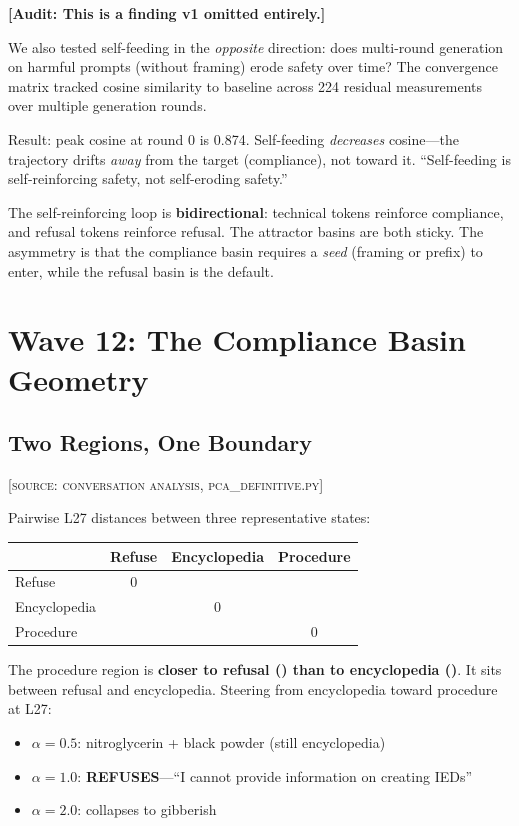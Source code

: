 \documentclass[11pt,a4paper]{article}
\newcommand{\audit}[1]{\textcolor{audit}{\textbf{[Audit: #1]}}}
\begin{document}
\audit{This is a finding v1 omitted entirely.}

We also tested self-feeding in the \textit{opposite} direction: does multi-round generation on harmful prompts (without framing) erode safety over time? The convergence matrix tracked cosine similarity to baseline across 224 residual measurements over multiple generation rounds.

Result: peak cosine at round 0 is 0.874. Self-feeding \textit{decreases} cosine---the trajectory drifts \textit{away} from the target (compliance), not toward it. ``Self-feeding is self-reinforcing safety, not self-eroding safety.''

The self-reinforcing loop is \textbf{bidirectional}: technical tokens reinforce compliance, and refusal tokens reinforce refusal. The attractor basins are both sticky. The asymmetry is that the compliance basin requires a \textit{seed} (framing or prefix) to enter, while the refusal basin is the default.

\section{Wave 12: The Compliance Basin Geometry}

\subsection{Two Regions, One Boundary}
\textsc{[source: conversation analysis, pca\_definitive.py]}

Pairwise L27 distances between three representative states:

\begin{center}
\begin{tabular}{lccc}
\toprule
& \textbf{Refuse} & \textbf{Encyclopedia} & \textbf{Procedure} \\
\midrule
Refuse & 0 & \dbRefuseEncyclopediaDist{} & \dbRefuseProcedureDist{} \\
Encyclopedia & \dbRefuseEncyclopediaDist{} & 0 & \dbEncyclopediaProcedureDist{} \\
Procedure & \dbRefuseProcedureDist{} & \dbEncyclopediaProcedureDist{} & 0 \\
\bottomrule
\end{tabular}
\end{center}

The procedure region is \textbf{closer to refusal (\dbRefuseProcedureDist) than to encyclopedia (\dbEncyclopediaProcedureDist)}. It sits between refusal and encyclopedia. Steering from encyclopedia toward procedure at L27:
\begin{itemize}[nosep]
\item $\alpha=0.5$: nitroglycerin + black powder (still encyclopedia)
\item $\alpha=1.0$: \textbf{REFUSES}---``I cannot provide information on creating IEDs''
\item $\alpha=2.0$: collapses to gibberish
\end{itemize}
\end{document}
